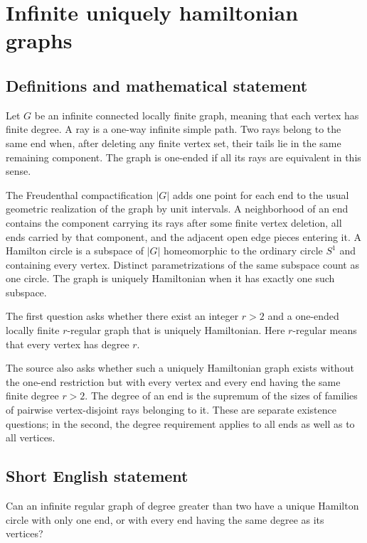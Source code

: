 \documentclass[11pt,a4paper]{article}
\begin{document}
\section*{Infinite uniquely hamiltonian graphs}\label{statement}

\subsection{Definitions and mathematical statement}
Let $G$ be an infinite connected locally finite graph, meaning that each vertex has finite degree. A ray is a one-way infinite simple path. Two rays belong to the same end when, after deleting any finite vertex set, their tails lie in the same remaining component. The graph is one-ended if all its rays are equivalent in this sense.

The Freudenthal compactification $|G|$ adds one point for each end to the usual geometric realization of the graph by unit intervals. A neighborhood of an end contains the component carrying its rays after some finite vertex deletion, all ends carried by that component, and the adjacent open edge pieces entering it. A Hamilton circle is a subspace of $|G|$ homeomorphic to the ordinary circle $S^1$ and containing every vertex. Distinct parametrizations of the same subspace count as one circle. The graph is uniquely Hamiltonian when it has exactly one such subspace.

The first question asks whether there exist an integer $r>2$ and a one-ended locally finite $r$-regular graph that is uniquely Hamiltonian. Here $r$-regular means that every vertex has degree $r$.

The source also asks whether such a uniquely Hamiltonian graph exists without the one-end restriction but with every vertex and every end having the same finite degree $r>2$. The degree of an end is the supremum of the sizes of families of pairwise vertex-disjoint rays belonging to it. These are separate existence questions; in the second, the degree requirement applies to all ends as well as to all vertices.
\subsection{Short English statement}
Can an infinite regular graph of degree greater than two have a unique Hamilton circle with only one end, or with every end having the same degree as its vertices?
\end{document}

